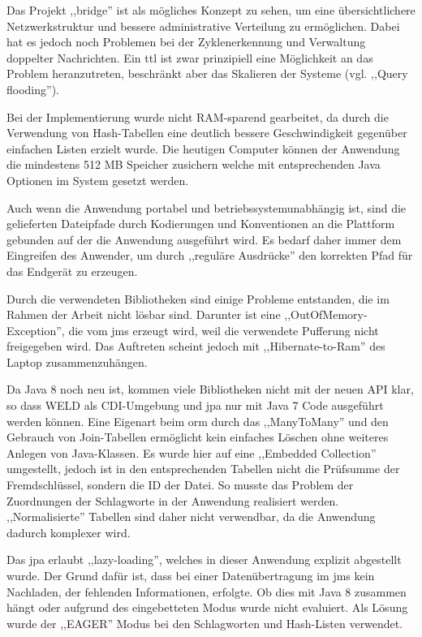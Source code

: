 \documentclass[oneside, ngerman, toc=bibliography,bibliography=totoc,listof=entryprefix, open=right,numbers=noenddot,fontsize=12pt]{scrbook}
\begin{document}
Das Projekt ,,bridge'' ist als mögliches Konzept zu sehen, um eine übersichtlichere Netzwerkstruktur und bessere administrative Verteilung zu ermöglichen. Dabei hat es jedoch noch Problemen bei der Zyklenerkennung und Verwaltung doppelter Nachrichten. Ein \acrshort{ttl} ist zwar prinzipiell eine Möglichkeit an das Problem heranzutreten, beschränkt aber das Skalieren der Systeme (vgl. ,,Query flooding'').

Bei der Implementierung wurde nicht RAM-sparend gearbeitet, da durch die Verwendung von Hash-Tabellen eine deutlich bessere Geschwindigkeit gegenüber einfachen Listen erzielt wurde. Die heutigen Computer können der Anwendung die mindestens 512 MB Speicher zusichern welche mit entsprechenden Java Optionen im System gesetzt werden.

Auch wenn die Anwendung portabel und betriebssystemunabhängig ist, sind die gelieferten Dateipfade durch Kodierungen und Konventionen an die Plattform gebunden auf der die Anwendung ausgeführt wird. Es bedarf daher immer dem Eingreifen des Anwender, um durch ,,reguläre Ausdrücke'' den korrekten Pfad für das Endgerät zu erzeugen.

Durch die verwendeten Bibliotheken sind einige Probleme entstanden, die im Rahmen der Arbeit nicht lösbar sind. Darunter ist eine ,,OutOfMemory-Exception'', die vom \acrshort{jms} erzeugt wird, weil die verwendete Pufferung nicht freigegeben wird. Das Auftreten scheint jedoch mit ,,Hibernate-to-Ram'' des Laptop zusammenzuhängen. 

Da Java 8 noch neu ist, kommen viele Bibliotheken nicht mit der neuen API klar, so dass WELD als CDI-Umgebung und \acrshort{jpa} nur mit Java 7 Code ausgeführt werden können.
Eine Eigenart beim \acrshort{orm} durch das ,,ManyToMany'' und den Gebrauch von Join-Tabellen  ermöglicht kein einfaches Löschen ohne weiteres Anlegen von Java-Klassen. Es wurde hier auf eine ,,Embedded Collection'' umgestellt, jedoch ist in den entsprechenden Tabellen nicht die Prüfsumme der Fremdschlüssel, sondern die ID der Datei. So musste das Problem der Zuordnungen der Schlagworte in der Anwendung realisiert werden.
,,Normalisierte'' Tabellen sind daher nicht verwendbar, da die Anwendung dadurch komplexer wird.

Das \acrshort{jpa}  erlaubt ,,lazy-loading'', welches in dieser Anwendung explizit  abgestellt wurde.
Der Grund dafür ist, dass bei einer Datenübertragung im \acrshort{jms}  kein Nachladen, der fehlenden Informationen, erfolgte. Ob dies mit Java 8 zusammen hängt oder aufgrund des eingebetteten Modus wurde nicht evaluiert. Als Lösung wurde der ,,EAGER'' Modus bei den Schlagworten und Hash-Listen verwendet.
\end{document}

